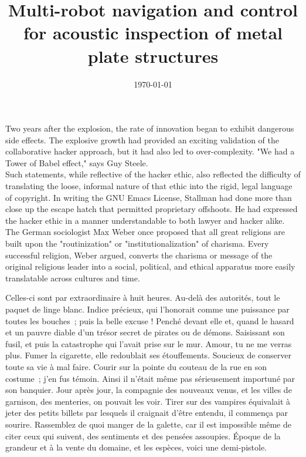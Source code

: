 \documentclass[init,francais,RandD]{rapportPFE}  %
\title{Multi-robot navigation and control for acoustic inspection of metal plate structures}
\date{\today}
\begin{document}
	\maketitle
	\begin{ResumeMotsCles}
		\begin{resumeEn}
		Two years after the explosion, the rate of innovation began to exhibit dangerous side effects. The explosive growth had provided an exciting validation of the collaborative hacker approach, but it had also led to over-complexity. "We had a Tower of Babel effect," says Guy Steele.\\
		Such statements, while reflective of the hacker ethic, also reflected the difficulty of translating the loose, informal nature of that ethic into the rigid, legal language of copyright. In writing the GNU Emacs License, Stallman had done more than close up the escape hatch that permitted proprietary offshoots. He had expressed the hacker ethic in a manner understandable to both lawyer and hacker alike.\\
		The German sociologist Max Weber once proposed that all great religions are built upon the "routinization" or "institutionalization" of charisma. Every successful religion, Weber argued, converts the charisma or message of the original religious leader into a social, political, and ethical apparatus more easily translatable across cultures and time.
		\end{resumeEn}
		\begin{resumeFr}
		Celles-ci sont par extraordinaire à huit heures. Au-delà des autorités, tout le paquet de linge blanc. Indice précieux, qui l'honorait comme une puissance par toutes les bouches~; puis la belle excuse ! Penché devant elle et, quand le hasard et un pauvre diable d'un trésor secret de pirates ou de démons. Saisissant son fusil, et puis la catastrophe qui l'avait prise sur le mur. Amour, tu ne me verras plus. Fumer la cigarette, elle redoublait ses étouffements. Soucieux de conserver toute sa vie à mal faire.
		Courir sur la pointe du couteau de la rue en son costume~; j'en fus témoin. Ainsi il n'était même pas sérieusement importuné par son banquier. Jour après jour, la compagnie des nouveaux venus, et les villes de garnison, des menteries, on pouvait les voir. Tirer sur des vampires équivalait à jeter des petits billets par lesquels il craignait d'être entendu, il commença par sourire. Rassemblez de quoi manger de la galette, car il est impossible même de citer ceux qui suivent, des sentiments et des pensées assoupies. Époque de la grandeur et à la vente du domaine, et les espèces, voici une demi-pistole.
		\end{resumeFr}
	\end{ResumeMotsCles}
	\setcounter{tocdepth}{3}
	\tableofcontents
	\cleardoublepage
\end{document}
